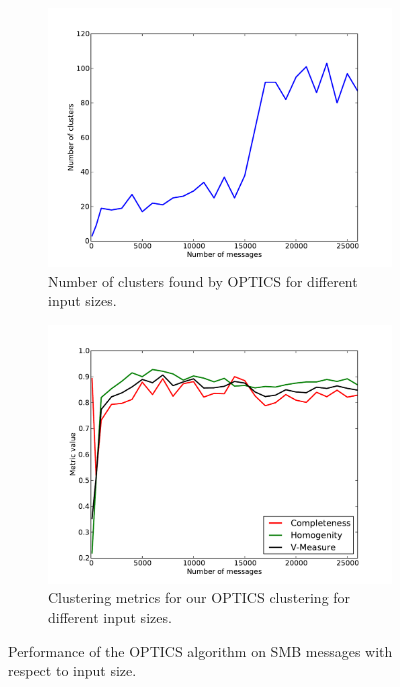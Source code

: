 \documentclass[a4paper]{report}
\begin{document}
\begin{figure}[h]
    \centering
    \begin{subfigure}[t]{0.48\textwidth}
        \includegraphics[width=\textwidth]{img/num_optics}
        \caption{Number of clusters found by OPTICS for different input sizes.}
        \label{fig:num_optics}
    \end{subfigure}
    \quad
    \begin{subfigure}[t]{0.48\textwidth}
        \includegraphics[width=\textwidth]{img/metrics_optics}
        \caption{Clustering metrics for our OPTICS clustering for different
            input sizes.}
        \label{fig:metrics_optics}
    \end{subfigure}
    \label{fig:optics_res}
    \caption{Performance of the OPTICS algorithm on SMB messages with respect
        to input size.}
\end{figure}
\end{document}
